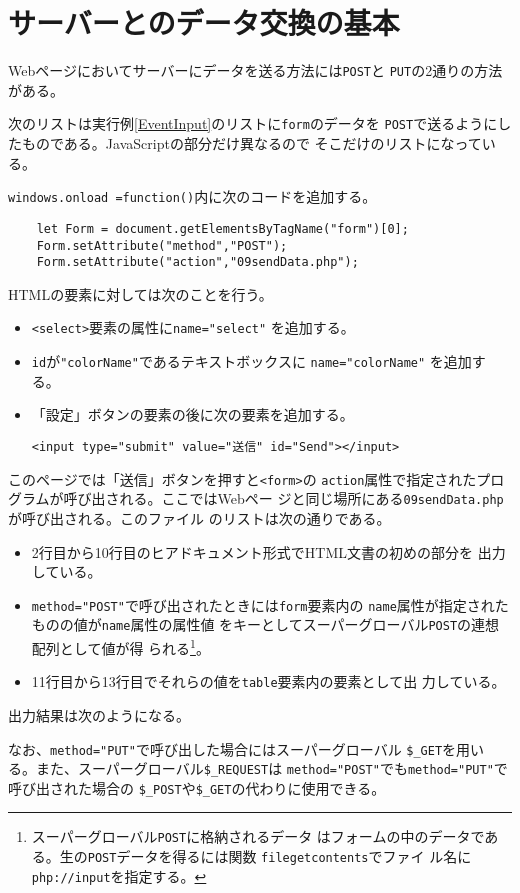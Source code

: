\section{サーバーとのデータ交換の基本}
\iftrue
Webページにおいてサーバーにデータを送る方法には\texttt{POST}と
\texttt{PUT}の2通りの方法がある。
\begin{Exec}\upshape\label{dataexchange}
 次のリストは実行例\ref{EventInput}のリストに\texttt{form}のデータを
 \texttt{POST}で送るようにしたものである。JavaScriptの部分だけ異なるので
 そこだけのリストになっている。

\texttt{windows.onload =function()}内に次のコードを追加する。
\begin{Verbatim}
    let Form = document.getElementsByTagName("form")[0];
    Form.setAttribute("method","POST");
    Form.setAttribute("action","09sendData.php");
\end{Verbatim}
HTMLの要素に対しては次のことを行う。
\begin{itemize}
 \item \texttt{<select>}要素の属性に\Verb+name="select"+ を追加する。
 \item \texttt{id}が\Verb+"colorName"+であるテキストボックスに
       \Verb+name="colorName"+ を追加する。
 \item 「設定」ボタンの要素の後に次の要素を追加する。
\begin{center}
\Verb+<input type="submit" value="送信" id="Send"></input>+ 
\end{center}
\end{itemize}
このページでは「送信」ボタンを押すと\texttt{<form>}の
\texttt{action}属性で指定されたプログラムが呼び出される。ここではWebペー
 ジと同じ場所にある\texttt{09sendData.php}が呼び出される。このファイル
 のリストは次の通りである。
 \newcommand{\POST}{\texttt{\textdollar\textunderscore POST}}
\begin{itemize}
 \item 2行目から10行目のヒアドキュメント形式でHTML文書の初めの部分を
       出力している。
 \item \Verb+method="POST"+で呼び出されたときには\texttt{form}要素内の
       \texttt{name}属性が指定されたものの値が\texttt{name}属性の属性値
       をキーとしてスーパーグローバル\POST の連想配列として値が得
       られる\footnote{スーパーグローバル\POST に格納されるデータ
       はフォームの中のデータである。生の\POST データを得るには関数
       \texttt{file\textunderscore get\textunderscore contents}でファイ
       ル名に\texttt{php://input}を指定する。}。
 \item 11行目から13行目でそれらの値を\texttt{table}要素内の要素として出
       力している。
\end{itemize}
出力結果は次のようになる。
\end{Exec}
なお、\Verb+method="PUT"+で呼び出した場合にはスーパーグローバル
\Verb+$_GET+を用いる。また、スーパーグローバル\Verb+$_REQUEST+は
\Verb+method="POST"+でも\Verb+method="PUT"+で呼び出された場合の
\Verb+$_POST+や\Verb+$_GET+の代わりに使用できる。

